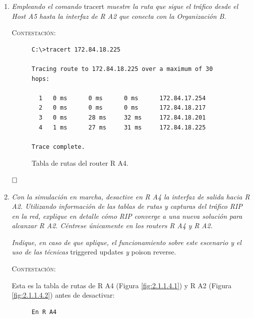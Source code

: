 \documentclass[11pt]{article}
\begin{document}
\begin{enumerate}
$\hfill\square$

\vspace{12px}

\item \textit{Empleando el comando} tracert \textit{muestre la ruta que sigue el tráfico
desde el Host A5 hasta la
interfaz de R A2 que conecta con la Organización B.}

\vspace{7px}

\textsc{Contestación}: 

\begin{figure}[h]
\begin{verbatim}
C:\>tracert 172.84.18.225

Tracing route to 172.84.18.225 over a maximum of 30 hops: 

  1   0 ms      0 ms      0 ms      172.84.17.254
  2   0 ms      0 ms      0 ms      172.84.18.217
  3   0 ms      28 ms     32 ms     172.84.18.201
  4   1 ms      27 ms     31 ms     172.84.18.225

Trace complete.
\end{verbatim}
\caption{Tabla de rutas del router R A4.}
\label{fig:2.1.1.3}
\end{figure}

$\hfill\square$

\vspace{12px}

\item \textit{Con la simulación en marcha, desactive en R A4 la interfaz de salida
hacia R A2. Utilizando información de las tablas de rutas y capturas
del tráfico RIP en la red, explique en detalle cómo RIP converge a una
nueva solución para alcanzar R A2. Céntrese únicamente en los
routers R A4 y R A2.}

\textit{Indique, en caso de que aplique, el funcionamiento sobre este
escenario y el uso de las técnicas} triggered updates \textit{y} poison reverse.


\vspace{7px}

\textsc{Contestación}: 

Esta es la tabla de rutas de R A4 (Figura \ref{fig:2.1.1.4.1}) y R A2 (Figura \ref{fig:2.1.1.4.2}) antes de desactivar:

\begin{figure}[h]
\begin{verbatim}
En R A4


\end{verbatim}
\end{figure}
\end{enumerate}
\end{document}
